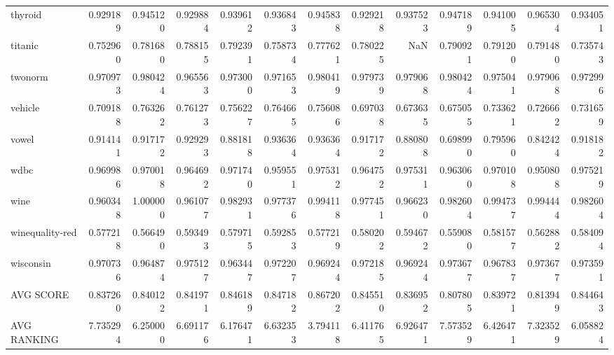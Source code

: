 \begin{tabular}{lrrrrrrrrrrrr}
thyroid         &   0.929189 &  0.945120 &  0.929884 &  0.939612 &  0.936843 &  0.945838 &  0.929218 &  0.937523 &  0.947189 &  0.941005 &  0.965304 &  0.934051 \\
titanic         &   0.752960 &  0.781680 &  0.788155 &  0.792391 &  0.758734 &  0.777621 &  0.780225 &       NaN &  0.790921 &  0.791200 &  0.791480 &  0.735743 \\
twonorm         &   0.970973 &  0.980424 &  0.965563 &  0.973000 &  0.971653 &  0.980419 &  0.979739 &  0.979068 &  0.980424 &  0.975041 &  0.979068 &  0.972996 \\
vehicle         &   0.709188 &  0.763262 &  0.761273 &  0.756227 &  0.764665 &  0.756086 &  0.697038 &  0.673635 &  0.675055 &  0.733621 &  0.726662 &  0.731659 \\
vowel           &   0.914141 &  0.917172 &  0.929293 &  0.881818 &  0.936364 &  0.936364 &  0.917172 &  0.880808 &  0.698990 &  0.795960 &  0.842424 &  0.918182 \\
wdbc            &   0.969986 &  0.970018 &  0.964692 &  0.971740 &  0.959551 &  0.975312 &  0.964752 &  0.975311 &  0.963060 &  0.970108 &  0.950808 &  0.975219 \\
wine            &   0.960348 &  1.000000 &  0.961077 &  0.982931 &  0.977376 &  0.994118 &  0.977451 &  0.966230 &  0.982604 &  0.994737 &  0.994444 &  0.982604 \\
winequality-red &   0.577218 &  0.566490 &  0.593493 &  0.579715 &  0.592853 &  0.577219 &  0.580202 &  0.594672 &  0.559080 &  0.581577 &  0.562882 &  0.584094 \\
wisconsin       &   0.970736 &  0.964874 &  0.975127 &  0.963447 &  0.972207 &  0.969244 &  0.972185 &  0.969244 &  0.973677 &  0.967837 &  0.973677 &  0.973591 \\
AVG SCORE       &   0.837260 &  0.840122 &  0.841971 &  0.846189 &  0.847182 &  0.867202 &  0.845510 &  0.836952 &  0.807805 &  0.839721 &  0.813949 &  0.844643 \\
AVG RANKING     &   7.735294 &  6.250000 &  6.691176 &  6.176471 &  6.632353 &  3.794118 &  6.411765 &  6.926471 &  7.573529 &  6.426471 &  7.323529 &  6.058824 \\
\bottomrule
\end{tabular}
